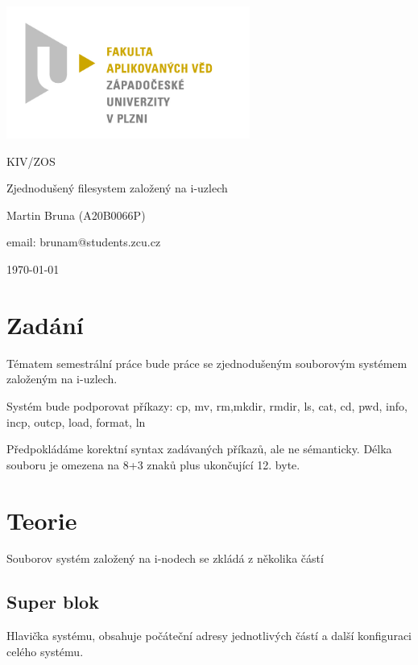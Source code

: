 \documentclass[a4paper,12pt]{article}
\begin{document}
	\begin{titlepage}
		\centering

		\includegraphics[width=8cm]{favlogo.jpg}

		\vspace{2cm}

		{\Huge KIV/ZOS}

		\vspace{1cm}

		{\Large Zjednodušený filesystem založený na i-uzlech}

		\vspace{3cm}

		{\Large Martin Bruna (A20B0066P)}\par
		email: brunam@students.zcu.cz

		\vfill

		\today
	\end{titlepage}

	\setcounter{secnumdepth}{4}
	\setcounter{tocdepth}{4}
	\tableofcontents
	\newpage

	\section{Zadání}
	Tématem semestrální práce bude práce se zjednodušeným souborovým systémem založeným na i-uzlech.

	Systém bude podporovat příkazy: cp, mv, rm,mkdir, rmdir, ls, cat, cd, pwd, info, incp, outcp, load, format, ln

	Předpokládáme korektní syntax zadávaných příkazů, ale ne sémanticky.
	Délka souboru je omezena na 8+3 znaků plus ukončující 12. byte.
	\newpage
	\section{Teorie}
	Souborov systém založený na i-nodech se zkládá z několika částí
	\subsection{Super blok}
	Hlavička systému, obsahuje počáteční adresy jednotlivých částí a další konfiguraci celého systému.
\end{document}
